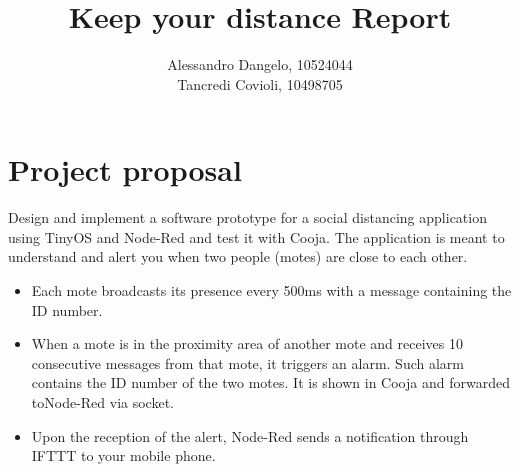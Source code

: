 \documentclass[11pt]{article}
\author{Alessandro Dangelo, 10524044 \\
Tancredi Covioli, 10498705}
\date{}
\title{Keep your distance Report}
\begin{document}
\maketitle

\section{Project proposal}
Design and implement a software prototype for a social distancing application using TinyOS and Node-Red and test it with Cooja. The application is meant to understand and alert you when two people (motes) are close to each other.

\begin{itemize}
    \item Each mote broadcasts its presence every 500ms with a message containing the ID number.
    \item When a mote is in the proximity area of another mote and receives 10 consecutive messages from that mote, it triggers an alarm. Such alarm contains the ID number of the two motes. It is shown in Cooja and forwarded toNode-Red via socket. 
    \item Upon the reception of the alert, Node-Red sends a notification through IFTTT to your mobile phone.
\end{itemize}
\end{document}
